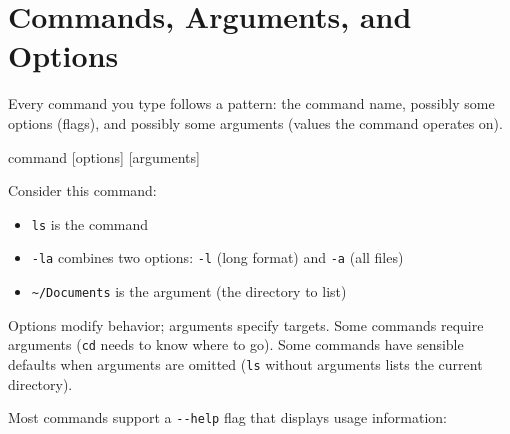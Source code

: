 \documentclass[
  letterpaper,
  DIV=11,
  numbers=noendperiod]{scrreprt}
\newenvironment{Shaded}{\begin{snugshade}}{\end{snugshade}}
\newcommand{\AttributeTok}[1]{\textcolor[rgb]{0.40,0.45,0.13}{#1}}
\newcommand{\ExtensionTok}[1]{\textcolor[rgb]{0.00,0.23,0.31}{#1}}
\newcommand{\NormalTok}[1]{\textcolor[rgb]{0.00,0.23,0.31}{#1}}
\providecommand{\tightlist}{%
  \setlength{\itemsep}{0pt}\setlength{\parskip}{0pt}}
\begin{document}
\section{Commands, Arguments, and
Options}\label{commands-arguments-and-options}

Every command you type follows a pattern: the command name, possibly
some options (flags), and possibly some arguments (values the command
operates on).

\begin{Shaded}
\begin{Highlighting}[]
\NormalTok{command [options] [arguments]}
\end{Highlighting}
\end{Shaded}

Consider this command:

\begin{codelisting}

\caption{\texttt{terminal}}

\begin{Shaded}
\end{Shaded}

\end{codelisting}

\begin{itemize}
\tightlist
\item
  \texttt{ls} is the command
\item
  \texttt{-la} combines two options: \texttt{-l} (long format) and
  \texttt{-a} (all files)
\item
  \texttt{\textasciitilde{}/Documents} is the argument (the directory to
  list)
\end{itemize}

Options modify behavior; arguments specify targets. Some commands
require arguments (\texttt{cd} needs to know where to go). Some commands
have sensible defaults when arguments are omitted (\texttt{ls} without
arguments lists the current directory).

Most commands support a \texttt{-\/-help} flag that displays usage
information:

\begin{codelisting}

\caption{\texttt{terminal}}

\begin{Shaded}
\end{Shaded}

\end{codelisting}
\end{document}
